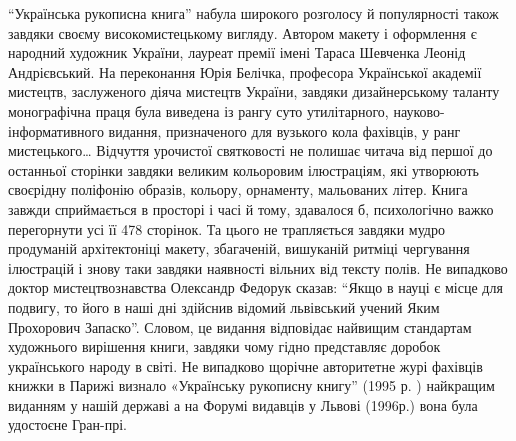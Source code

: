 “Українська рукописна книга” набула широкого розголосу й популярності також
завдяки своєму високомистецькому вигляду. Автором макету і оформлення є
народний художник України, лауреат премії імені Тараса Шевченка Леонід
Андрієвський. На переконання Юрія Белічка, професора Української академії
мистецтв, заслуженого діяча мистецтв України, завдяки дизайнерському таланту
монографічна праця була виведена із рангу суто утилітарного,
науково-інформативного видання, призначеного для вузького кола фахівців, у ранг
мистецького… Відчуття урочистої святковості не полишає читача від першої до
останньої сторінки завдяки великим кольоровим ілюстраціям, які утворюють
своєрідну поліфонію образів, кольору, орнаменту, мальованих літер. Книга завжди
сприймається в просторі і часі й тому, здавалося б, психологічно важко
перегорнути усі її 478 сторінок. Та цього не трапляється завдяки мудро
продуманій архітектоніці макету, збагаченій, вишуканій ритміці чергування
ілюстрацій і знову таки завдяки наявності вільних від тексту полів. Не
випадково доктор мистецтвознавства Олександр Федорук сказав: “Якщо в науці є
місце для подвигу, то його в наші дні здійснив відомий львівський учений Яким
Прохорович Запаско”. Словом, це видання відповідає найвищим стандартам
художнього вирішення книги, завдяки чому гідно представляє доробок українського
народу в світі. Не випадково щорічне авторитетне журі фахівців книжки в Парижі
визнало «Українську рукописну книгу” (1995 р. ) найкращим виданням у нашій
державі а на Форумі видавців у Львові (1996р.) вона була удостоєне Гран-прі.
